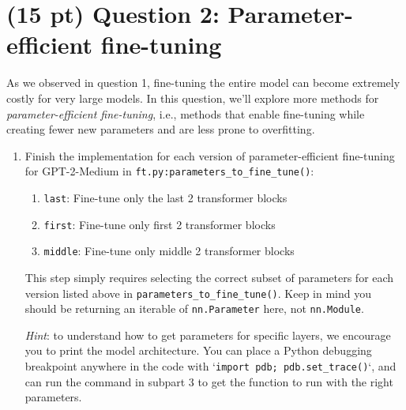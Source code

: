 \documentclass[12pt]{article}
\begin{document}
\section*{(15 pt) Question 2: Parameter-efficient fine-tuning}
As we observed in question 1, fine-tuning the entire model can become extremely costly for very large models. In this question, we'll explore more methods for \textit{parameter-efficient fine-tuning}, i.e., methods that enable fine-tuning while creating fewer new parameters and are less prone to overfitting.
\begin{enumerate}
    \item Finish the implementation for each version of parameter-efficient fine-tuning for GPT-2-Medium in \texttt{ft.py:parameters\_to\_fine\_tune()}:
    \begin{enumerate}
        \item \texttt{last}: Fine-tune only the last 2 transformer blocks
        \item \texttt{first}: Fine-tune only first 2 transformer blocks
        \item \texttt{middle}: Fine-tune only middle 2 transformer blocks
    \end{enumerate}
    This step simply requires selecting the correct subset of parameters for each version listed above in \texttt{parameters\_to\_fine\_tune()}. Keep in mind you should be returning an iterable of \texttt{nn.Parameter} here, not \texttt{nn.Module}.

    \emph{Hint}: to understand how to get parameters for specific layers, we encourage you to print the model architecture. You can place a Python debugging breakpoint anywhere in the code with `\texttt{import pdb; pdb.set\_trace()}`, and can run the command in subpart 3 to get the function to run with the right parameters.


\end{enumerate}
\end{document}
